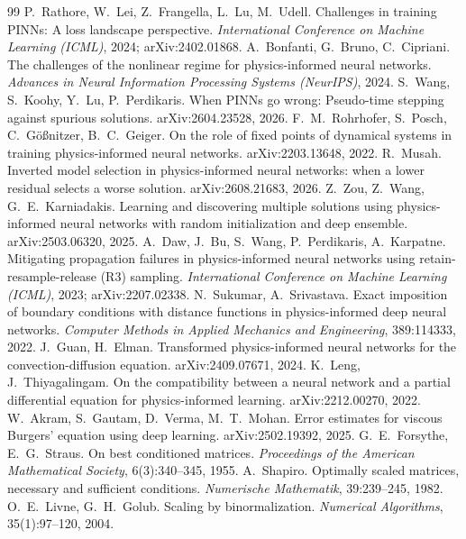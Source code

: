 \documentclass[11pt]{article}
\numberwithin{equation}{section}
\begin{document}
\begin{thebibliography}{99}
 P.~Rathore, W.~Lei, Z.~Frangella, L.~Lu, M.~Udell. Challenges in training PINNs: A loss landscape perspective. \emph{International Conference on Machine Learning (ICML)}, 2024; arXiv:2402.01868.
 A.~Bonfanti, G.~Bruno, C.~Cipriani. The challenges of the nonlinear regime for physics-informed neural networks. \emph{Advances in Neural Information Processing Systems (NeurIPS)}, 2024.
 S.~Wang, S.~Koohy, Y.~Lu, P.~Perdikaris. When PINNs go wrong: Pseudo-time stepping against spurious solutions. arXiv:2604.23528, 2026.
 F.~M.~Rohrhofer, S.~Posch, C.~G\"o{\ss}nitzer, B.~C.~Geiger. On the role of fixed points of dynamical systems in training physics-informed neural networks. arXiv:2203.13648, 2022.
 R.~Musah. Inverted model selection in physics-informed neural networks: when a lower residual selects a worse solution. arXiv:2608.21683, 2026.
 Z.~Zou, Z.~Wang, G.~E.~Karniadakis. Learning and discovering multiple solutions using physics-informed neural networks with random initialization and deep ensemble. arXiv:2503.06320, 2025.
 A.~Daw, J.~Bu, S.~Wang, P.~Perdikaris, A.~Karpatne. Mitigating propagation failures in physics-informed neural networks using retain-resample-release (R3) sampling. \emph{International Conference on Machine Learning (ICML)}, 2023; arXiv:2207.02338.
 N.~Sukumar, A.~Srivastava. Exact imposition of boundary conditions with distance functions in physics-informed deep neural networks. \emph{Computer Methods in Applied Mechanics and Engineering}, 389:114333, 2022.
 J.~Guan, H.~Elman. Transformed physics-informed neural networks for the convection-diffusion equation. arXiv:2409.07671, 2024.
 K.~Leng, J.~Thiyagalingam. On the compatibility between a neural network and a partial differential equation for physics-informed learning. arXiv:2212.00270, 2022.
 W.~Akram, S.~Gautam, D.~Verma, M.~T.~Mohan. Error estimates for viscous Burgers' equation using deep learning. arXiv:2502.19392, 2025.
 G.~E.~Forsythe, E.~G.~Straus. On best conditioned matrices. \emph{Proceedings of the American Mathematical Society}, 6(3):340--345, 1955.
 A.~Shapiro. Optimally scaled matrices, necessary and sufficient conditions. \emph{Numerische Mathematik}, 39:239--245, 1982.
 O.~E.~Livne, G.~H.~Golub. Scaling by binormalization. \emph{Numerical Algorithms}, 35(1):97--120, 2004.

\end{thebibliography}
\end{document}
